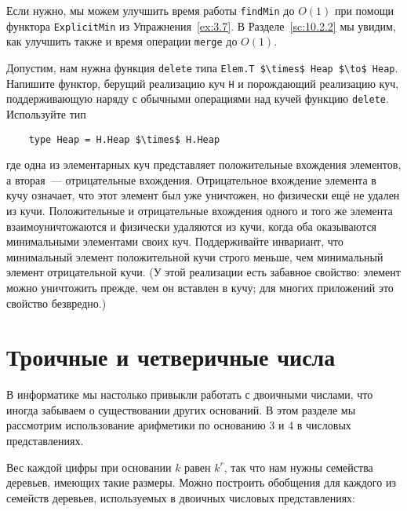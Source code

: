 Если нужно, мы можем улучшить время работы \lstinline!findMin! до
$O(1)$ при помощи функтора \lstinline!ExplicitMin! из
Упражнения~\ref{ex:3.7}. В Разделе~\ref{sc:10.2.2} мы увидим, как
улучшить также и время операции \lstinline!merge! до $O(1)$.

\begin{exercise}\label{ex:9.16}
  Допустим, нам нужна функция \lstinline!delete! типа 
  \lstinline!Elem.T $\times$ Heap $\to$ Heap!.
  Напишите функтор, берущий реализацию куч \lstinline!H! и порождающий
  реализацию куч, поддерживающую наряду с обычными операциями над
  кучей функцию \lstinline!delete!. Используйте тип
  \begin{lstlisting}
    type Heap = H.Heap $\times$ H.Heap
  \end{lstlisting}
  где одна из элементарных куч представляет положительные вхождения
  элементов, а вторая~--- отрицательные вхождения. Отрицательное
  вхождение элемента в кучу означает, что этот элемент был уже
  уничтожен, но физически ещё не удален из кучи.  Положительные и
  отрицательные вхождения одного и того же элемента
  взаимоуничтожаются и физически удаляются из кучи, когда оба
  оказываются минимальными элементами своих куч.  Поддерживайте
  инвариант, что минимальный элемент положительной кучи строго меньше,
  чем минимальный элемент отрицательной кучи. (У этой реализации есть
  забавное свойство: элемент можно уничтожить прежде, чем он
  вставлен в кучу; для многих приложений это свойство безвредно.)
\end{exercise}

\section{Троичные и четверичные числа}
\label{sc:9.4}

В информатике мы настолько привыкли работать с двоичными числами, что
иногда забываем о существовании других оснований. В этом разделе мы
рассмотрим использование арифметики по основанию 3 и 4 в числовых
представлениях.

Вес каждой цифры при основании $k$ равен $k^r$, так что нам нужны
семейства деревьев, имеющих такие размеры. Можно построить обобщения
для каждого из семейств деревьев, используемых в двоичных числовых
представлениях:

